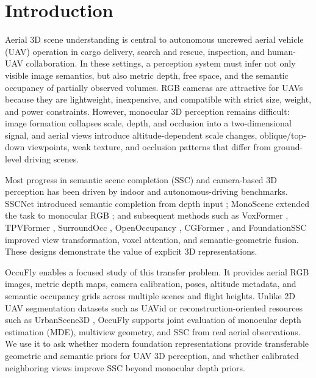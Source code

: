 \section{Introduction}
\label{sec:introduction}

Aerial 3D scene understanding is central to autonomous uncrewed aerial vehicle (UAV) operation in cargo delivery, search and rescue, inspection, and human-UAV collaboration. In these settings, a perception system must infer not only visible image semantics, but also metric depth, free space, and the semantic occupancy of partially observed volumes. RGB cameras are attractive for UAVs because they are lightweight, inexpensive, and compatible with strict size, weight, and power constraints. However, monocular 3D perception remains difficult: image formation collapses scale, depth, and occlusion into a two-dimensional signal, and aerial views introduce altitude-dependent scale changes, oblique/top-down viewpoints, weak texture, and occlusion patterns that differ from ground-level driving scenes.

Most progress in semantic scene completion (SSC) and camera-based 3D perception has been driven by indoor and autonomous-driving benchmarks. SSCNet introduced semantic completion from depth input \cite{song2017sscnet}; MonoScene extended the task to monocular RGB \cite{cao2022monoscene}; and subsequent methods such as VoxFormer \cite{li2023voxformer}, TPVFormer \cite{huang2023tpvformer}, SurroundOcc \cite{wei2023surroundocc}, OpenOccupancy \cite{wang2023openoccupancy}, CGFormer \cite{yu2024cgformer}, and FoundationSSC \cite{chen2025foundationssc} improved view transformation, voxel attention, and semantic-geometric fusion. These designs demonstrate the value of explicit 3D representations.

OccuFly \cite{gross2026occufly} enables a focused study of this transfer problem. It provides aerial RGB images, metric depth maps, camera calibration, poses, altitude metadata, and semantic occupancy grids across multiple scenes and flight heights. Unlike 2D UAV segmentation datasets such as UAVid \cite{lyu2020uavid} or reconstruction-oriented resources such as UrbanScene3D \cite{lin2022urbanscene3d}, OccuFly supports joint evaluation of monocular depth estimation (MDE), multiview geometry, and SSC from real aerial observations. We use it to ask whether modern foundation representations provide transferable geometric and semantic priors for UAV 3D perception, and whether calibrated neighboring views improve SSC beyond monocular depth priors.

